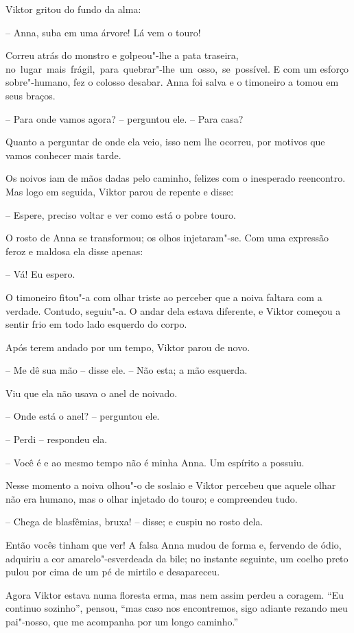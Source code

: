 Viktor gritou do fundo da alma:

-- Anna, suba em uma árvore! Lá vem o touro!

Correu atrás do monstro e golpeou"-lhe a pata traseira, \mbox{no lugar mais
frágil, para quebrar"-lhe um osso, se possível.} E com um esforço
sobre"-humano, fez o colosso desabar. Anna foi salva e o timoneiro a
tomou em seus braços.

-- Para onde vamos agora? -- perguntou ele. -- Para casa?

Quanto a perguntar de onde ela veio, isso nem lhe ocorreu, por motivos
que vamos conhecer mais tarde. 

Os noivos iam de mãos dadas pelo caminho, felizes com o inesperado
reencontro. Mas logo em seguida, Viktor parou de repente e disse:

-- Espere, preciso voltar e ver como está o pobre touro.

O rosto de Anna se transformou; os olhos injetaram"-se. Com uma
expressão feroz e maldosa ela disse apenas:

-- Vá! Eu espero.

O timoneiro fitou"-a com olhar triste ao perceber que a noiva faltara
com a verdade. Contudo, seguiu"-a. O andar dela estava diferente, e
Viktor começou a sentir frio em todo lado esquerdo do corpo. 

Após terem andado por um tempo, Viktor parou de novo.

-- Me dê sua mão -- disse ele. -- Não esta; a mão esquerda.

Viu que ela não usava o anel de noivado.

-- Onde está o anel? -- perguntou ele.

-- Perdi -- respondeu ela.

-- Você é e ao mesmo tempo não é minha Anna. Um espírito a possuiu.

Nesse momento a noiva olhou"-o de soslaio e Viktor percebeu que aquele
olhar não era humano, mas o olhar injetado do touro; e compreendeu
tudo.

-- Chega de blasfêmias, bruxa! -- disse; e cuspiu no rosto dela.

Então vocês tinham que ver! A falsa Anna mudou de forma e, fervendo de
ódio, adquiriu a cor amarelo"-esverdeada da bile; no instante
seguinte, um coelho preto pulou por cima de um pé de mirtilo e
desapareceu. 

Agora Viktor estava numa floresta erma, mas nem assim perdeu a coragem.
``Eu continuo sozinho'', pensou, ``mas caso
nos encontremos, sigo adiante rezando meu pai"-nosso, que me acompanha
por um longo caminho.'' 

